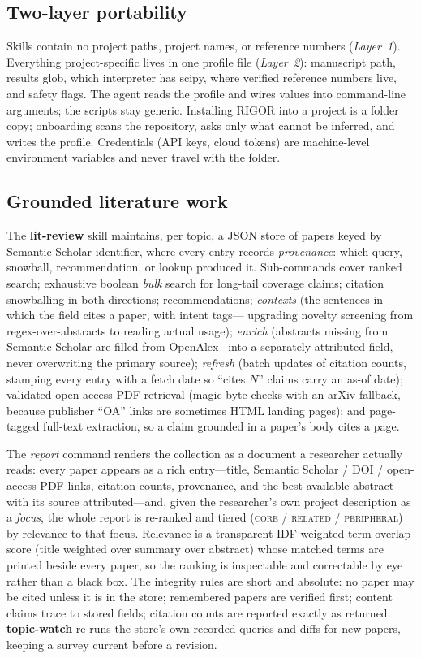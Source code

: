 \documentclass[11pt]{article}
\begin{document}
\subsection{Two-layer portability}

Skills contain no project paths, project names, or reference numbers
(\emph{Layer~1}). Everything project-specific lives in one profile file
(\emph{Layer~2}): manuscript path, results glob, which interpreter has scipy,
where verified reference numbers live, and safety flags. The agent reads the
profile and wires values into command-line arguments; the scripts stay
generic. Installing RIGOR into a project is a folder copy; onboarding scans
the repository, asks only what cannot be inferred, and writes the profile.
Credentials (API keys, cloud tokens) are machine-level environment variables
and never travel with the folder.

\subsection{Grounded literature work}
\label{sec:lit}

The \textbf{lit-review} skill maintains, per topic, a JSON store of papers
keyed by Semantic Scholar identifier, where every entry records
\emph{provenance}: which query, snowball, recommendation, or lookup produced
it. Sub-commands cover ranked search; exhaustive boolean \emph{bulk} search
for long-tail coverage claims; citation snowballing in both directions;
recommendations; \emph{contexts} (the sentences in which the field cites a
paper, with intent tags--- upgrading novelty screening from
regex-over-abstracts to reading actual usage); \emph{enrich} (abstracts
missing from Semantic Scholar are filled from
OpenAlex~\cite{priem2022openalex} into a separately-attributed field, never
overwriting the primary source); \emph{refresh} (batch updates of citation
counts, stamping every entry with a fetch date so ``cites $N$'' claims carry
an as-of date); validated open-access PDF retrieval (magic-byte checks with an
arXiv fallback, because publisher ``OA'' links are sometimes HTML landing
pages); and page-tagged full-text extraction, so a claim grounded in a paper's
body cites a page.

The \emph{report} command renders the collection as a document a researcher
actually reads: every paper appears as a rich entry---title, Semantic
Scholar / DOI / open-access-PDF links, citation counts, provenance, and the
best available abstract with its source attributed---and, given the
researcher's own project description as a \emph{focus}, the whole report is
re-ranked and tiered (\textsc{core} / \textsc{related} /
\textsc{peripheral}) by relevance to that focus. Relevance is a transparent
IDF-weighted term-overlap score (title weighted over summary over abstract)
whose matched terms are printed beside every paper, so the ranking is
inspectable and correctable by eye rather than a black box. The integrity
rules are short and absolute: no paper may be cited unless it is in the
store; remembered papers are verified first; content claims trace to stored
fields; citation counts are reported exactly as returned.
\textbf{topic-watch} re-runs the store's own recorded queries and diffs for
new papers, keeping a survey current before a revision.
\end{document}
